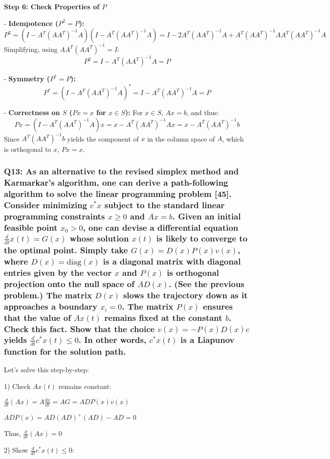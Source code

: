 \documentclass[8pt]{article}
\begin{document}
{\textbf{Step 6: Check Properties of \(P\)}

- \textbf{Idempotence (\(P^2 = P\)):}
\[
P^2 = (I - A^T (AA^T)^{-1} A)(I - A^T (AA^T)^{-1} A) = I - 2A^T (AA^T)^{-1} A + A^T (AA^T)^{-1} AA^T (AA^T)^{-1} A
\]
Simplifying, using \(AA^T (AA^T)^{-1} = I\):
\[
P^2 = I - A^T (AA^T)^{-1} A = P
\]

- \textbf{Symmetry (\(P^* = P\)):}
\[
P^* = (I - A^T (AA^T)^{-1} A)^* = I - A^T (AA^T)^{-1} A = P
\]

- \textbf{Correctness on \(S\) (\(Px = x\) for \(x \in S\)):}
For \(x \in S\), \(Ax = b\), and thus:
\[
Px = (I - A^T (AA^T)^{-1} A)x = x - A^T (AA^T)^{-1} Ax = x - A^T (AA^T)^{-1}b
\]
Since \(A^T (AA^T)^{-1}b\) yields the component of \(x\) in the column space of \(A\), which is orthogonal to \(x\), \(Px = x\).

\subsubsection*{Q13: As an alternative to the revised simplex method and Karmarkar’s algorithm, one can derive a path-following algorithm to solve the linear programming problem [45]. Consider minimizing \( c^* x \) subject to the standard linear programming constraints \( x \geq 0 \) and \( Ax = b \). Given an initial feasible point \( x_0 > 0 \), one can devise a differential equation \( \frac{d}{dt} x(t) = G(x) \) whose solution \( x(t) \) is likely to converge to the optimal point. Simply take \( G(x) = D(x) P(x) v(x) \), where \( D(x) = \text{diag}(x) \) is a diagonal matrix with diagonal entries given by the vector \( x \) and \( P(x) \) is orthogonal projection onto the null space of \( AD(x) \). (See the previous problem.) The matrix \( D(x) \) slows the trajectory down as it approaches a boundary \( x_i = 0 \). The matrix \( P(x) \) ensures that the value of \( Ax(t) \) remains fixed at the constant \( b \). Check this fact. Show that the choice \( v(x) = -P(x) D(x) c \) yields \( \frac{d}{dt} c^* x(t) \leq 0 \). In other words, \( c^* x(t) \) is a Liapunov function for the solution path.}

Let's solve this step-by-step:

1) Check $Ax(t)$ remains constant:

   $\frac{d}{dt}(Ax) = A\frac{dx}{dt} = AG = ADP(x)v(x)$
   
   $ADP(x) = AD(AD)^+(AD) - AD = 0$

   Thus, $\frac{d}{dt}(Ax) = 0$

2) Show $\frac{d}{dt} c^* x(t) \leq 0$:

}
\end{document}
